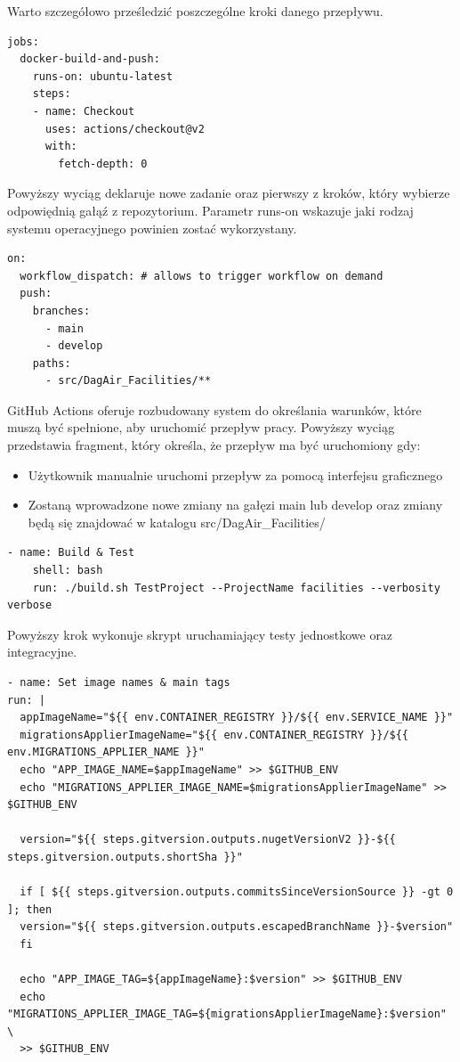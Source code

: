 \documentclass[11pt, a4]{article} %
\begin{document}
Warto szczegółowo prześledzić poszczególne kroki danego przepływu.

\begin{lstlisting}
jobs:
  docker-build-and-push:
    runs-on: ubuntu-latest
    steps:
    - name: Checkout
      uses: actions/checkout@v2
      with:
        fetch-depth: 0
\end{lstlisting}

Powyższy wyciąg deklaruje nowe zadanie oraz pierwszy z kroków, który wybierze 
odpowiędnią gałąź z repozytorium. Parametr runs-on wskazuje jaki rodzaj systemu 
operacyjnego powinien zostać wykorzystany.

\begin{lstlisting}
on:
  workflow_dispatch: # allows to trigger workflow on demand
  push:
    branches: 
      - main
      - develop
    paths:
      - src/DagAir_Facilities/**
\end{lstlisting}

GitHub Actions oferuje rozbudowany system do określania warunków, które muszą być 
spełnione, aby uruchomić przepływ pracy. Powyższy wyciąg przedstawia fragment, który 
określa, że przepływ ma być uruchomiony gdy:

\begin{itemize} %
    \item Użytkownik manualnie uruchomi przepływ za pomocą interfejsu graficznego
    \item Zostaną wprowadzone nowe zmiany na gałęzi main lub develop oraz zmiany będą 
    się znajdować w katalogu src/DagAir\_Facilities/
\end{itemize}

\begin{lstlisting}
- name: Build & Test
    shell: bash
    run: ./build.sh TestProject --ProjectName facilities --verbosity verbose
\end{lstlisting}

Powyższy krok wykonuje skrypt uruchamiający testy jednostkowe oraz integracyjne.

\begin{lstlisting}
- name: Set image names & main tags
run: |
  appImageName="${{ env.CONTAINER_REGISTRY }}/${{ env.SERVICE_NAME }}"
  migrationsApplierImageName="${{ env.CONTAINER_REGISTRY }}/${{ env.MIGRATIONS_APPLIER_NAME }}"
  echo "APP_IMAGE_NAME=$appImageName" >> $GITHUB_ENV
  echo "MIGRATIONS_APPLIER_IMAGE_NAME=$migrationsApplierImageName" >> $GITHUB_ENV

  version="${{ steps.gitversion.outputs.nugetVersionV2 }}-${{ steps.gitversion.outputs.shortSha }}"

  if [ ${{ steps.gitversion.outputs.commitsSinceVersionSource }} -gt 0 ]; then
  version="${{ steps.gitversion.outputs.escapedBranchName }}-$version"
  fi

  echo "APP_IMAGE_TAG=${appImageName}:$version" >> $GITHUB_ENV
  echo "MIGRATIONS_APPLIER_IMAGE_TAG=${migrationsApplierImageName}:$version" \
  >> $GITHUB_ENV
\end{lstlisting}
\end{document}
